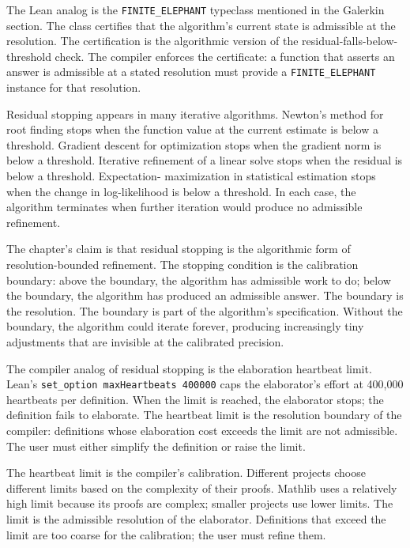 The Lean analog is the \texttt{FINITE\_ELEPHANT} typeclass mentioned
in the Galerkin section. The class certifies that the algorithm's
current state is admissible at the resolution. The certification is
the algorithmic version of the residual-falls-below-threshold check.
The compiler enforces the certificate: a function that asserts an
answer is admissible at a stated resolution must provide a
\texttt{FINITE\_ELEPHANT} instance for that resolution.

Residual stopping appears in many iterative algorithms. Newton's
method for root finding stops when the function value at the current
estimate is below a threshold. Gradient descent for optimization stops
when the gradient norm is below a threshold. Iterative refinement of a
linear solve stops when the residual is below a threshold. Expectation-
maximization in statistical estimation stops when the change in
log-likelihood is below a threshold. In each case, the algorithm
terminates when further iteration would produce no admissible
refinement.

The chapter's claim is that residual stopping is the algorithmic
form of resolution-bounded refinement. The stopping condition is the
calibration boundary: above the boundary, the algorithm has admissible
work to do; below the boundary, the algorithm has produced an
admissible answer. The boundary is the resolution. The boundary is
part of the algorithm's specification. Without the boundary, the
algorithm could iterate forever, producing increasingly tiny
adjustments that are invisible at the calibrated precision.

The compiler analog of residual stopping is the elaboration
heartbeat limit. Lean's \texttt{set\_option maxHeartbeats 400000}
caps the elaborator's effort at 400,000 heartbeats per definition.
When the limit is reached, the elaborator stops; the definition
fails to elaborate. The heartbeat limit is the resolution boundary
of the compiler: definitions whose elaboration cost exceeds the
limit are not admissible. The user must either simplify the
definition or raise the limit.

The heartbeat limit is the compiler's calibration. Different
projects choose different limits based on the complexity of their
proofs. Mathlib uses a relatively high limit because its proofs are
complex; smaller projects use lower limits. The limit is the
admissible resolution of the elaborator. Definitions that exceed
the limit are too coarse for the calibration; the user must refine
them.

